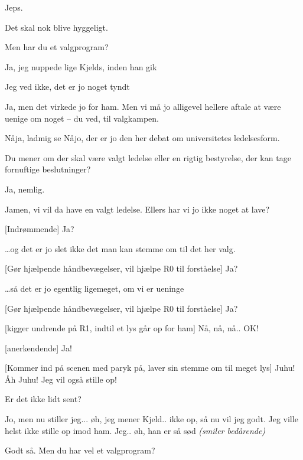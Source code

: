 \documentclass[a4paper,11pt]{article}
\begin{document}
\begin{sketch}
   Jeps.

   Det skal nok blive hyggeligt.

   Men har du et valgprogram?

   Ja, jeg nuppede lige Kjelds, inden han gik 
  

   Jeg ved ikke, det er jo noget tyndt
  
   Ja, men det virkede jo for ham. Men vi må jo alligevel
  hellere aftale at være uenige om noget -- du ved, til valgkampen.
  
   Nåja, ladmig se  Nåjo, der er jo den her debat
  om universitetes ledelsesform.
  
   Du mener om der skal være valgt ledelse eller en rigtig
  bestyrelse, der kan tage fornuftige beslutninger?

   Ja, nemlig.
  
   Jamen, vi vil da have en valgt ledelse. Ellers har vi jo
  ikke noget at lave?

   [Indrømmende] Ja?
  
   \ldots og det er jo slet ikke det man kan stemme om til
  det her valg.
  
   [Gør hjælpende håndbevægelser, vil hjælpe R0 til
  forståelse] Ja?

   \ldots så det er jo egentlig ligemeget, om vi er ueninge

   [Gør hjælpende håndbevægelser, vil hjælpe R0 til
  forståelse] Ja?
  
   [kigger undrende på R1, indtil et lys går op for ham] Nå,
  nå, nå.. OK!

   [anerkendende] Ja!
  
   [Kommer ind på scenen med paryk på, laver sin stemme om til
  meget lys] Juhu! Åh Juhu! Jeg vil også stille op!

   Er det ikke lidt sent?
  
   Jo, men nu stiller jeg... øh, jeg mener Kjeld.. ikke op, så
  nu vil jeg godt. Jeg ville helst ikke stille op imod ham. Jeg.. øh,
  han er så sød \em{(smiler bedårende)}

   Godt så. Men du har vel et valgprogram?
  

\end{sketch}
\end{document}
